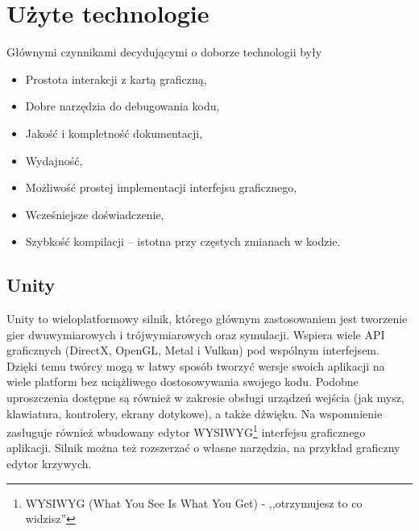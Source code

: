 \chapter*{Użyte technologie}
Głównymi czynnikami decydującymi o doborze technologii były
\begin{itemize}
	\item Prostota interakcji z kartą graficzną,
	\item Dobre narzędzia do debugowania kodu,
	\item Jakość i kompletność dokumentacji,
	\item Wydajność,
	\item Możliwość prostej implementacji interfejsu graficznego,
	\item Wcześniejsze doświadczenie,
	\item Szybkość kompilacji -- istotna przy częstych zmianach w kodzie.
\end{itemize}
\section*{Unity}
Unity to wieloplatformowy silnik, którego głównym zastosowaniem jest tworzenie gier dwuwymiarowych i trójwymiarowych oraz symulacji. Wspiera wiele API graficznych (DirectX, OpenGL, Metal i Vulkan)\cite{UnityManualGraphicsApiSupport} pod wspólnym interfejsem. Dzięki temu twórcy mogą w łatwy sposób tworzyć wersje swoich aplikacji na wiele platform bez uciążliwego dostosowywania swojego kodu. Podobne uproszczenia dostępne są również w zakresie obsługi urządzeń wejścia (jak mysz, klawiatura, kontrolery, ekrany dotykowe), a także dźwięku. Na wspomnienie zasługuje również wbudowany edytor WYSIWYG\footnote{WYSIWYG (What You See Is What You Get) - ,,otrzymujesz to co widzisz''} interfejsu graficznego aplikacji. Silnik można też rozszerzać o własne narzędzia, na przykład graficzny edytor krzywych.